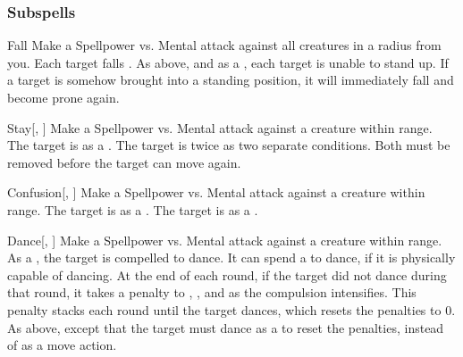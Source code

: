 \subsubsection{Subspells}


\begin{ability}[\nth{1}]{Fall}
Make a Spellpower vs. Mental attack against all creatures in a \areamed radius from you.
\hit Each target falls .
\hit As above, and as a , each target is unable to stand up.
If a target is somehow brought into a standing position, it will immediately fall and become prone again.
\end{ability}
\vspace{0.25em}


\begin{ability}[\nth{1}]{Stay}[, ]
Make a Spellpower vs. Mental attack against a creature within \rngmed range.
\hit The target is \immobilized as a .
\crit The target is  twice as two separate conditions.
Both must be removed before the target can move again.
\end{ability}
\vspace{0.25em}


\begin{ability}[\nth{2}]{Confusion}[, ]
Make a Spellpower vs. Mental attack against a creature within \rngmed range.
\hit The target is \disoriented as a .
\crit The target is \confused as a .
\end{ability}
\vspace{0.25em}


\begin{ability}[\nth{3}]{Dance}[, ]
Make a Spellpower vs. Mental attack against a creature within \rngmed range.
\hit As a , the target is compelled to dance.
It can spend a  to dance, if it is physically capable of dancing.
At the end of each round, if the target did not dance during that round, it takes a  penalty to , , and  as the compulsion intensifies.
This penalty stacks each round until the target dances, which resets the penalties to 0.
\crit As above, except that the target must dance as a  to reset the penalties, instead of as a move action.
\end{ability}
\vspace{0.25em}


